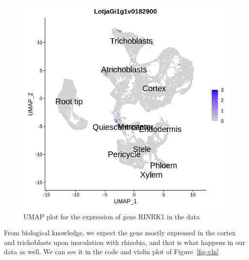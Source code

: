 \documentclass[
  letterpaper,
  DIV=11,
  numbers=noendperiod]{scrartcl}
\begin{document}
\begin{figure}[H]

{\centering \includegraphics{notebook_files/figure-pdf/fig-rinrk-output-1.png}

}

\caption{\label{fig-rinrk}UMAP plot for the expression of gene RINRK1 in
the data}

\end{figure}

From biological knowledge, we expect the gene mostly expressed in the
cortex and trichoblasts upon inoculation with rhizobia, and that is what
happens in our data as well. We can see it in the code and violin plot
of Figure~\ref{fig-vln}
\end{document}
